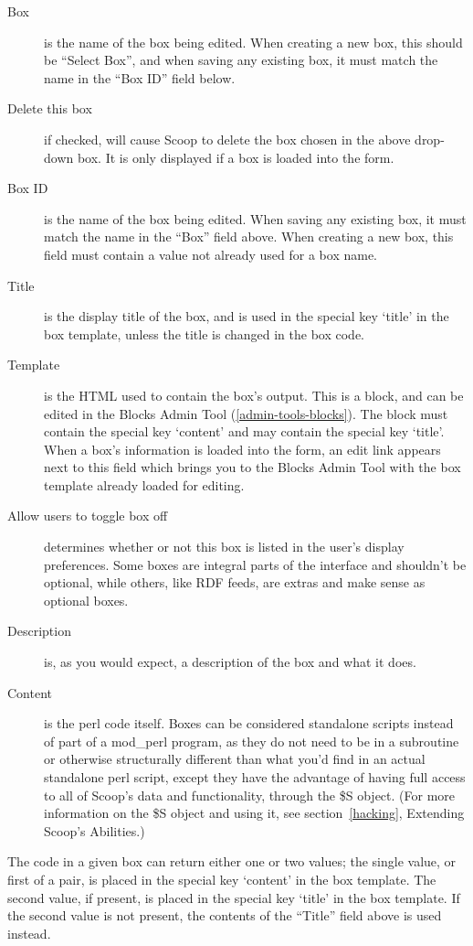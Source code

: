 \begin{description}
\item[Box] is the name of the box being edited. When creating a new box, this should be ``Select Box'', and when saving any existing box, it must match the name in the ``Box ID'' field below.
\item[Delete this box] if checked, will cause Scoop to delete the box chosen in the above drop-down box. It is only displayed if a box is loaded into the form.
\item[Box ID] is the name of the box being edited. When saving any existing box, it must match the name in the ``Box'' field above. When creating a new box, this field must contain a value not already used for a box name.
\item[Title] is the display title of the box, and is used in the special key `title' in the box template, unless the title is changed in the box code.
\item[Template] is the HTML used to contain the box's output. This is a block, and can be edited in the Blocks Admin Tool (\ref{admin-tools-blocks}). The block must contain the special key `content' and may contain the special key `title'. When a box's information is loaded into the form, an edit link appears next to this field which brings you to the Blocks Admin Tool with the box template already loaded for editing.
\item[Allow users to toggle box off] determines whether or not this box is listed in the user's display preferences. Some boxes are integral parts of the interface and shouldn't be optional, while others, like RDF feeds, are extras and make sense as optional boxes.
\item[Description] is, as you would expect, a description of the box and what it does.
\item[Content] is the perl code itself. Boxes can be considered standalone scripts instead of part of a mod\_perl program, as they do not need to be in a subroutine or otherwise structurally different than what you'd find in an actual standalone perl script, except they have the advantage of having full access to all of Scoop's data and functionality, through the \$S object. (For more information on the \$S object and using it, see section~\ref{hacking}, Extending Scoop's Abilities.)
\end{description}

The code in a given box can return either one or two values; the single value, or first of a pair, is placed in the special key `content' in the box template. The second value, if present, is placed in the special key `title' in the box template. If the second value is not present, the contents of the ``Title'' field above is used instead.

